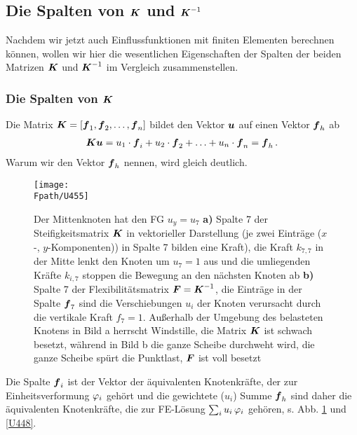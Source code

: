 {\textcolor{sectionTitleBlue}{\section{Die Spalten von $\mbox{\boldmath $K$}$ und $\mbox{\boldmath $K$}^{-1}$}}

Nachdem wir jetzt auch Einflussfunktionen mit finiten Elementen berechnen k\"{o}nnen, wollen wir hier die wesentlichen Eigenschaften der Spalten der beiden Matrizen $\mbox{\boldmath $K$}$ und $\mbox{\boldmath $K$}^{-1}$ im Vergleich zusammenstellen.

{\textcolor{sectionTitleBlue}{\subsubsection*{Die Spalten von $\mbox{\boldmath $K$}$}}}
Die Matrix $\mbox{\boldmath $K$} = [\mbox{\boldmath $f$}_1, \mbox{\boldmath $f$}_2, \ldots, \mbox{\boldmath $f$}_n]$ bildet den Vektor $\mbox{\boldmath $u$}$ auf einen Vektor $\mbox{\boldmath $f$}_h$ ab
\begin{align}
\mbox{\boldmath $K$} \mbox{\boldmath $u$} = u_1 \cdot \mbox{\boldmath $f$}_i + u_2 \cdot \mbox{\boldmath $f$}_2 + \ldots + u_n \cdot \mbox{\boldmath $f$}_n = \mbox{\boldmath $f$}_h\,.
\end{align}
Warum wir den Vektor $\mbox{\boldmath $f$}_h$ nennen, wird gleich deutlich.

\begin{figure}
\centering
\if {} \sidecaption \fi
\texttt{[image: \\Fpath/U455]}
\caption{Der Mittenknoten hat den FG $u_y = u_{7}$ \textbf{ a)} Spalte 7 der Steifigkeitsmatrix $\mbox{\boldmath $K$}$ in vektorieller Darstellung (je zwei Eintr\"{a}ge ($x$-, $y$-Komponenten)) in Spalte 7 bilden eine Kraft), die Kraft $k_{7, 7}$ in der Mitte lenkt den Knoten um $u_{7} = 1$ aus und die umliegenden Kr\"{a}fte $k_{i,7}$ stoppen die Bewegung an den n\"{a}chsten Knoten ab \textbf{ b)} Spalte 7 der Flexibilit\"{a}tsmatrix $\mbox{\boldmath $F$} = \mbox{\boldmath $K$}^{-1}$, die Eintr\"{a}ge in der Spalte $\mbox{\boldmath $f$}_{7}$ sind die Verschiebungen $u_i$ der Knoten verursacht durch die vertikale Kraft $f_{7} = 1$. Au{\ss}erhalb der Umgebung des belasteten Knotens in Bild a herrscht \glq Windstille\grq{}, die Matrix $\mbox{\boldmath $K$}$ ist schwach besetzt, w\"{a}hrend in Bild b die ganze Scheibe \glq durchweht wird\grq{}, die ganze Scheibe sp\"{u}rt die Punktlast, $\mbox{\boldmath $F$}$ ist voll besetzt }
\label{U447}%
\end{figure}%
Die Spalte $\mbox{\boldmath $f$}_i$ ist der Vektor der \"{a}quivalenten Knotenkr\"{a}fte, der zur Einheitsverformung $\varphi_i$ geh\"{o}rt und die gewichtete ($u_i$) Summe  $\mbox{\boldmath $f$}_h$ sind daher die \"{a}quivalenten Knotenkr\"{a}fte, die zur FE-L\"{o}sung $\sum_i u_i\,\varphi_i$ geh\"{o}ren, s. Abb. \ref{U447} und \ref{U448}.

}
